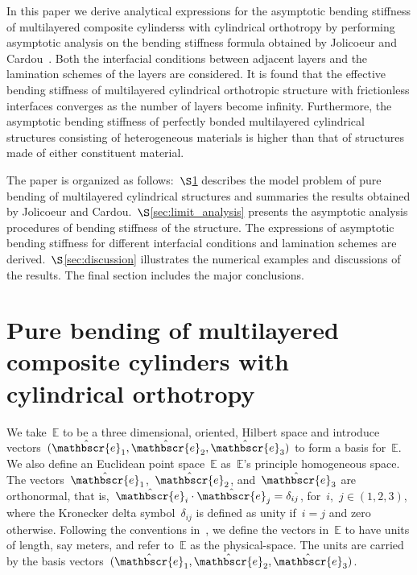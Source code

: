 \documentclass[preprint,10pt,times]{elsarticle}
\numberwithin{equation}{section}
\newcommand{\physe}{\hat{\mathbscr{e}}} %
\renewcommand{\>}{$\Rightarrow$}
\begin{document}
In this paper we derive analytical expressions for the asymptotic bending stiffness of multilayered composite cylinderss with cylindrical orthotropy by performing asymptotic analysis on the bending stiffness formula obtained by Jolicoeur and Cardou~\cite{Jolicoeur1994}.
%
Both the interfacial conditions between adjacent layers and the lamination schemes of the layers are considered.
%
It is found that the effective bending stiffness of multilayered cylindrical orthotropic structure with frictionless interfaces converges as the number of layers become infinity. %
Furthermore, the asymptotic bending stiffness of perfectly bonded multilayered cylindrical structures consisting of heterogeneous materials is higher than that of structures made of either constituent material.


The paper is organized as follows:~$\S$\ref{sec:bending_model} describes the model problem of pure bending of multilayered cylindrical structures and summaries the results obtained by Jolicoeur and Cardou.~$\S$\ref{sec:limit_analysis} presents the asymptotic analysis procedures of bending stiffness of the structure. The expressions of asymptotic bending stiffness for different interfacial conditions and lamination schemes are derived.~$\S$\ref{sec:discussion} illustrates the numerical examples and discussions of the results. The final section includes the major conclusions.



\section{Pure bending of multilayered composite cylinders with cylindrical orthotropy}
\label{sec:bending_model}

We take~$\mathbb{E}$ to be a three dimensional, oriented, Hilbert space and introduce vectors~$(\physe_1,\physe_2,\physe_3)$ to form a basis for~$\mathbb{E}$. We also define an Euclidean point space~$\mathbb{E}$ as~$\mathbb{E}$'s principle homogeneous space.
The vectors~$\physe_1$,~$\physe_2$, and~$\physe_3$ are orthonormal, that is,~$\physe_i\cdot\physe_j=\delta_{ij}$, for~$i$,~$j\in (1,2,3)$, where the Kronecker delta symbol~$\delta_{ij}$ is defined as unity if~$i=j$ and zero otherwise.
Following the conventions in~\cite{rahaman2020accelerometer,deng2021angle}, we define the vectors in~$\mathbb{E}$ to have units of length, say meters, and refer to~$\mathbb{E}$ as the physical-space. The units are carried by the basis vectors~$(\physe_1,\physe_2,\physe_3)$.
\end{document}
